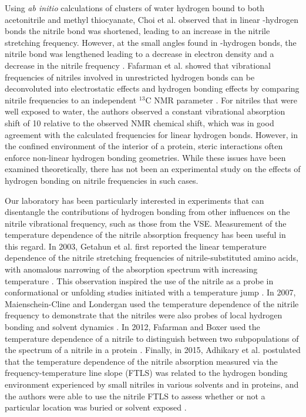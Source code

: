 Using \emph{ab initio} calculations of clusters of water hydrogen bound to both acetonitrile and methyl thiocyanate, Choi et al. observed that in linear \textsigma{}-hydrogen bonds the nitrile bond was shortened, leading to an increase in the nitrile stretching frequency.
However, at the small angles found in \textpi{}-hydrogen bonds, the nitrile bond was lengthened leading to a decrease in electron density and a decrease in the nitrile frequency \cite{Choi2008}.
Fafarman et al. showed that vibrational frequencies of nitriles involved in unrestricted hydrogen bonds can be deconvoluted into electrostatic effects and hydrogen bonding effects by comparing nitrile frequencies to an independent $^{13}$C NMR parameter \cite{Fafarman2010}.
For nitriles that were well exposed to water, the authors observed a constant vibrational absorption shift of 10 \si{\wn} relative to the observed NMR chemical shift, which was in good agreement with the calculated frequencies for linear hydrogen bonds.
However, in the confined environment of the interior of a protein, steric interactions often enforce non-linear hydrogen bonding geometries.
While these issues have been examined theoretically, there has not been an experimental study on the effects of hydrogen bonding on nitrile frequencies in such cases.

Our laboratory has been particularly interested in experiments that can disentangle the contributions of hydrogen bonding from other influences on the nitrile vibrational frequency, such as those from the VSE.
Measurement of the temperature dependence of the nitrile absorption frequency has been useful in this regard.
In 2003, Getahun et al. first reported the linear temperature dependence of the nitrile stretching frequencies of nitrile-substituted amino acids, with anomalous narrowing of the absorption spectrum with increasing temperature \cite{Getahun2003}.
This observation inspired the use of the nitrile as a probe in conformational or unfolding studies initiated with a temperature jump \cite{Getahun2003, Huang2003}.
In 2007, Maienschein-Cline and Londergan used the temperature dependence of the nitrile frequency to demonstrate that the nitriles were also probes of local hydrogen bonding and solvent dynamics \cite{Maienschein-Cline2007}.
In 2012, Fafarman and Boxer used the temperature dependence of a nitrile to distinguish between two subpopulations of the spectrum of a nitrile in a protein \cite{Fafarman2010a}.
Finally, in 2015, Adhikary et al. postulated that the temperature dependence of the nitrile absorption measured via the frequency-temperature line slope (FTLS) was related to the hydrogen bonding environment experienced by small nitriles in various solvents and in proteins, and the authors were able to use the nitrile FTLS to assess whether or not a particular location was buried or solvent exposed \cite{Adhikary2015}.

